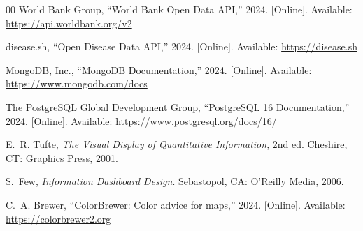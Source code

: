 \documentclass[conference]{IEEEtran}
\begin{document}
\begin{thebibliography}{00}
World Bank Group, ``World Bank Open Data API,'' 2024. [Online]. Available:
\url{https://api.worldbank.org/v2}

disease.sh, ``Open Disease Data API,'' 2024. [Online]. Available:
\url{https://disease.sh}

MongoDB, Inc., ``MongoDB Documentation,'' 2024. [Online]. Available:
\url{https://www.mongodb.com/docs}

The PostgreSQL Global Development Group, ``PostgreSQL 16 Documentation,'' 2024.
[Online]. Available: \url{https://www.postgresql.org/docs/16/}

E.~R. Tufte, \emph{The Visual Display of Quantitative Information}, 2nd ed.
Cheshire, CT: Graphics Press, 2001.

S.~Few, \emph{Information Dashboard Design}. Sebastopol, CA: O'Reilly Media,
2006.

C.~A. Brewer, ``ColorBrewer: Color advice for maps,'' 2024. [Online].
Available: \url{https://colorbrewer2.org}

\end{thebibliography}
\end{document}
